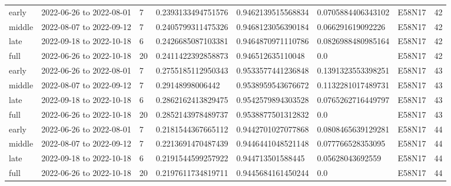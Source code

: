 \begin{longtable}{llllllll}
early & 2022-06-26 to 2022-08-01 & 7 & 0.2393133494751576 & 0.9462139515568834 & 0.0705884406343102 & E58N17 & 42 \\
middle & 2022-08-07 to 2022-09-12 & 7 & 0.2405799311475326 & 0.9468123056390184 & 0.066291619092226 & E58N17 & 42 \\
late & 2022-09-18 to 2022-10-18 & 6 & 0.2426685087103381 & 0.9464870971110786 & 0.0826988480985164 & E58N17 & 42 \\
full & 2022-06-26 to 2022-10-18 & 20 & 0.2411422392858873 & 0.946512635110048 & 0.0 & E58N17 & 42 \\
early & 2022-06-26 to 2022-08-01 & 7 & 0.2755185112950343 & 0.9533577441236848 & 0.1391323553398251 & E58N17 & 43 \\
middle & 2022-08-07 to 2022-09-12 & 7 & 0.29148998006442 & 0.9538959543676672 & 0.1132281017489731 & E58N17 & 43 \\
late & 2022-09-18 to 2022-10-18 & 6 & 0.2862162413829475 & 0.9542579894303528 & 0.0765262716449797 & E58N17 & 43 \\
full & 2022-06-26 to 2022-10-18 & 20 & 0.2852143978489737 & 0.9538877501312832 & 0.0 & E58N17 & 43 \\
early & 2022-06-26 to 2022-08-01 & 7 & 0.2181544367665112 & 0.9442701027077868 & 0.0808465639129281 & E58N17 & 44 \\
middle & 2022-08-07 to 2022-09-12 & 7 & 0.2213691470487439 & 0.9446441048521148 & 0.077766528353095 & E58N17 & 44 \\
late & 2022-09-18 to 2022-10-18 & 6 & 0.2191544599257922 & 0.944713501588445 & 0.05628043692559 & E58N17 & 44 \\
full & 2022-06-26 to 2022-10-18 & 20 & 0.2197611734819711 & 0.9445684161450244 & 0.0 & E58N17 & 44 \\
\bottomrule
\end{longtable}

